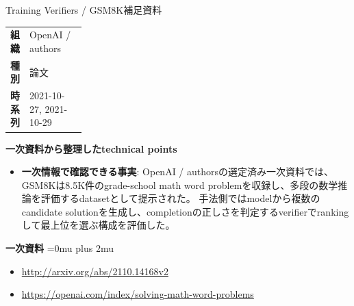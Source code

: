 \begin{technicalnote}{Training Verifiers / GSM8K}{補足資料}
\begingroup
\begin{tabularx}{\linewidth}{@{}>{\bfseries}p{0.22\linewidth}X@{}}
組織 & OpenAI / authors \\
種別 & 論文 \\
時系列 & 2021-10-27, 2021-10-29 \\
\end{tabularx}
\smallskip
\begin{minipage}{\linewidth}
{\bfseries 一次資料から整理したtechnical points}
\begin{itemize}[leftmargin=1.5em,itemsep=0.35em]
\item \textbf{一次情報で確認できる事実}: OpenAI / authorsの選定済み一次資料では、GSM8Kは8.5K件のgrade-school math word problemを収録し、多段の数学推論を評価するdatasetとして提示された。 手法側ではmodelから複数のcandidate solutionを生成し、completionの正しさを判定するverifierでrankingして最上位を選ぶ構成を評価した。
\end{itemize}
\begin{minipage}{\linewidth}
\begin{samepage}
{\bfseries 一次資料}
\begingroup\sloppy
\Urlmuskip=0mu plus 2mu\relax
\begin{itemize}[leftmargin=1.5em,itemsep=0.25em]
\item {\scriptsize\url{http://arxiv.org/abs/2110.14168v2}}
\item {\scriptsize\url{https://openai.com/index/solving-math-word-problems}}
\end{itemize}
\endgroup
\end{samepage}
\end{minipage}
\end{minipage}
\endgroup
\end{technicalnote}
\medskip
